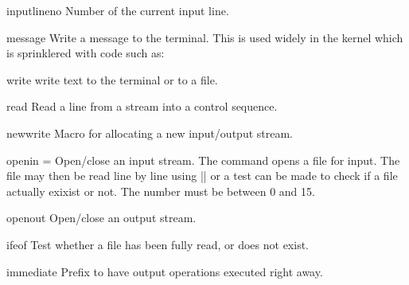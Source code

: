 \begin{docCommand*}{inputlineno}{}
 Number of the current input line.
\end{docCommand*}

\begin{docCommand*}{message}{}
 Write a message to the terminal. This is used widely in the kernel which is sprinklered with code such as:
\end{docCommand*}

\begin{teXXX}
\end{teXXX}

\begin{docCommand*}{write} {}
 write  text to the terminal or to a file. 
\end{docCommand*}

\begin{docCommand*} {read} {}
 Read a line from a stream into a control sequence.
\end{docCommand*}

\begin{docCommand*}{newwrite}{}
  Macro for allocating a new input/output stream.
\end{docCommand*}

\begin{docCommand*}{openin}{ = }
  Open/close an input stream. The command opens a file for input. The file may then 
be read line by line using |\read| or a test can be made to check if a file actually exixist or not. The number must be between 0 and 15. 
\end{docCommand*}

\begin{docCommand*}{openout}{}
  Open/close an output stream.
\end{docCommand*}

\begin{docCommand*}{ifeof}{}
 Test whether a file has been fully read, or does not exist.\\
\end{docCommand*}

\begin{docCommand*}{immediate}{}
 Prefix to have output operations executed right away.\\
\end{docCommand*}

